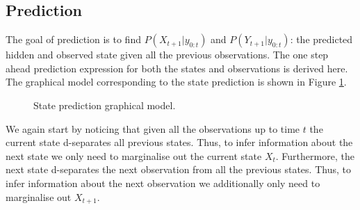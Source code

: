 \subsection{Prediction}
The goal of prediction is to find $P(X_{t+1}|y_{0:t})$ and $P(Y_{t+1}|y_{0:t})$: the predicted hidden and observed state given all the previous observations. The one step ahead prediction expression for both the states and observations is derived here. The graphical model corresponding to the state prediction is shown in Figure \ref{fig_linmod_pred_hmm}. 
\begin{figure}[H] 
\centering
{}
\caption{State prediction graphical model.}
\label{fig_linmod_pred_hmm}
\end{figure}
We again start by noticing that given all the observations  up to time $t$ the current state d-separates  all previous states. Thus, to infer information about the next state we only need to marginalise out the current state $X_t$. Furthermore, the next state d-separates the next observation from all the previous states. Thus, to infer information about the next observation we additionally only need to marginalise out $X_{t+1}$.

